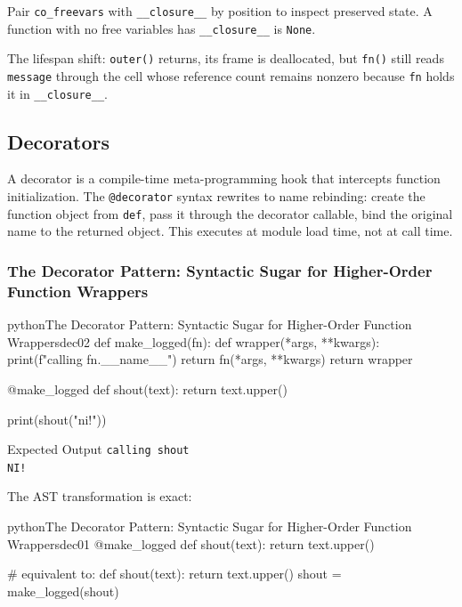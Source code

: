 \documentclass[a4paper,twoside]{report}
\begin{document}
Pair \texttt{co\_freevars} with \texttt{\_\_closure\_\_} by position to inspect preserved state. A function with no free variables has \texttt{\_\_closure\_\_} is \texttt{None}.

The lifespan shift: \texttt{outer()} returns, its frame is deallocated, but \texttt{fn()} still reads \texttt{message} through the cell whose reference count remains nonzero because \texttt{fn} holds it in \texttt{\_\_closure\_\_}.


\subsection{Decorators}

A decorator is a compile-time meta-programming hook that intercepts function initialization. The \texttt{@decorator} syntax rewrites to name rebinding: create the function object from \texttt{def}, pass it through the decorator callable, bind the original name to the returned object. This executes at module load time, not at call time.

\subsubsection{The Decorator Pattern: Syntactic Sugar for Higher-Order Function Wrappers}

\begin{codebox}[]{python}{The Decorator Pattern: Syntactic Sugar for Higher-Order Function Wrappers}{dec02}
def make_logged(fn):
    def wrapper(*args, **kwargs):
        print(f"calling {fn.__name__}")
        return fn(*args, **kwargs)
    return wrapper

@make_logged
def shout(text):
    return text.upper()

print(shout("ni!"))
\end{codebox}


\begin{iobox}{Expected Output}
\texttt{calling shout} \\
\texttt{NI!} \\
\end{iobox}




The AST transformation is exact:

\begin{codebox}[]{python}{The Decorator Pattern: Syntactic Sugar for Higher-Order Function Wrappers}{dec01}
@make_logged
def shout(text):
    return text.upper()

# equivalent to:
def shout(text):
    return text.upper()
shout = make_logged(shout)
\end{codebox}
\end{document}
